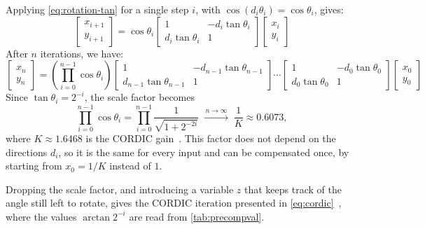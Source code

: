 Applying \cref{eq:rotation-tan} for a single step $i$, with
$\cos(d_{i}\theta_{i}) = \cos\theta_{i}$, gives:
\begin{equation}
  \begin{bmatrix} x_{i+1} \\ y_{i+1}
  \end{bmatrix}
  = \cos\theta_{i}
  \begin{bmatrix}
    1 & -d_{i}\tan\theta_{i} \\
    d_{i}\tan\theta_{i} & 1
  \end{bmatrix}
  \begin{bmatrix} x_{i} \\ y_{i}
  \end{bmatrix}
  \label{eq:rotation-iter}
\end{equation}
After $n$ iterations, we have:
\begin{equation}
  \begin{bmatrix} x_{n} \\ y_{n}
  \end{bmatrix}
  = \left( \prod_{i=0}^{n-1} \cos\theta_{i} \right)
  \begin{bmatrix} 1 & -d_{n-1}\tan\theta_{n-1} \\ d_{n-1}\tan\theta_{n-1} & 1
  \end{bmatrix}
  \cdots
  \begin{bmatrix} 1 & -d_{0}\tan\theta_{0} \\ d_{0}\tan\theta_{0} & 1
  \end{bmatrix}
  \begin{bmatrix} x_{0} \\ y_{0}
  \end{bmatrix}
  \label{eq:rotation-n}
\end{equation}
Since $\tan\theta_{i} = 2^{-i}$, the scale factor becomes
\begin{equation}
  \prod_{i=0}^{n-1} \cos\theta_{i}
  = \prod_{i=0}^{n-1} \frac{1}{\sqrt{1 + 2^{-2i}}}
  \;\xrightarrow{\,n \to \infty\,}\; \frac{1}{K} \approx 0.6073,
  \label{eq:cordic-gain}
\end{equation}
where $K \approx 1.6468$ is the CORDIC gain~\cite{muller2020}. This factor does not depend on the directions $d_{i}$, so it is the same for every input and can be compensated once, by starting from $x_{0} = 1/K$ instead of $1$.

Dropping the scale factor, and introducing a variable $z$ that keeps track of
the angle still left to rotate, gives the CORDIC iteration presented in
\cref{eq:cordic}~\cite{muller2020}, where the values $\arctan 2^{-i}$ are read
from \cref{tab:precompval}.

